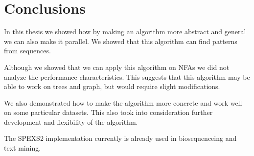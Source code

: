 
\chapter{Conclusions}

\WIP










In this thesis we showed how by making an algorithm more abstract and general we can also make it parallel. We showed that this algorithm can find patterns from sequences.

Although we showed that we can apply this algorithm on NFAs we did not analyze the performance characteristics. This suggests that this algorithm may be able to work on trees and graph, but would require slight modifications.

We also demonstrated how to make the algorithm more concrete and work well on some particular datasets. This also took into consideration further development and flexibility of the algorithm.

The SPEXS2 implementation currently is already used in biosequenceing and text mining.
